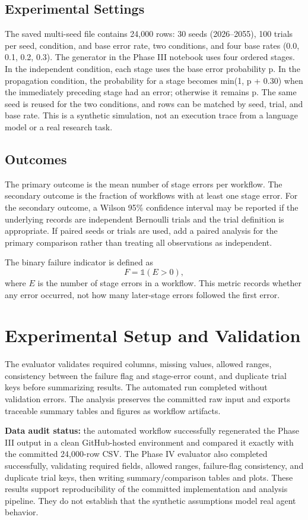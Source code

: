 \documentclass[conference]{IEEEtran}
\begin{document}
\subsection{Experimental Settings}
The saved multi-seed file contains 24,000 rows: 30 seeds (2026–2055), 100 trials per seed, condition, and base error rate, two conditions, and four base rates (0.0, 0.1, 0.2, 0.3). The generator in the Phase III notebook uses four ordered stages. In the independent condition, each stage uses the base error probability p. In the propagation condition, the probability for a stage becomes min(1, p + 0.30) when the immediately preceding stage had an error; otherwise it remains p. The same seed is reused for the two conditions, and rows can be matched by seed, trial, and base rate. This is a synthetic simulation, not an execution trace from a language model or a real research task.

\subsection{Outcomes}
The primary outcome is the mean number of stage errors per workflow. The secondary outcome is the fraction of workflows with at least one stage error. For the secondary outcome, a Wilson 95\% confidence interval may be reported if the underlying records are independent Bernoulli trials and the trial definition is appropriate. If paired seeds or trials are used, add a paired analysis for the primary comparison rather than treating all observations as independent.

The binary failure indicator is defined as
\[
F = \mathbb{1}(E > 0),
\]
where $E$ is the number of stage errors in a workflow. This metric records whether any error occurred, not how many later-stage errors followed the first error.

\section{Experimental Setup and Validation}
The evaluator validates required columns, missing values, allowed ranges, consistency between the failure flag and stage-error count, and duplicate trial keys before summarizing results. The automated run completed without validation errors. The analysis preserves the committed raw input and exports traceable summary tables and figures as workflow artifacts.

\textbf{Data audit status:} the automated workflow successfully regenerated the Phase III output in a clean GitHub-hosted environment and compared it exactly with the committed 24,000-row CSV. The Phase IV evaluator also completed successfully, validating required fields, allowed ranges, failure-flag consistency, and duplicate trial keys, then writing summary/comparison tables and plots. These results support reproducibility of the committed implementation and analysis pipeline. They do not establish that the synthetic assumptions model real agent behavior.
\end{document}
